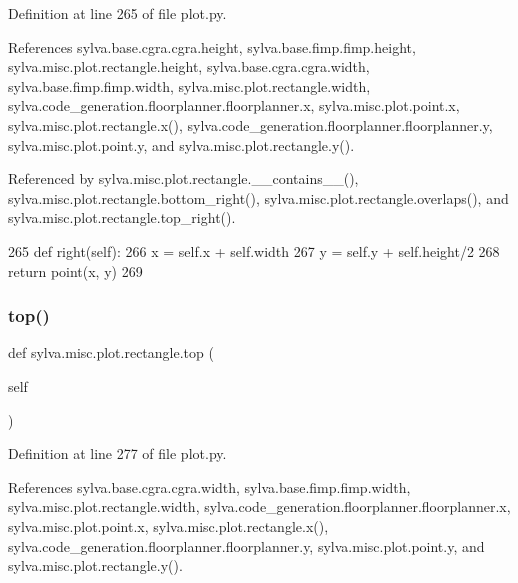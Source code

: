 Definition at line 265 of file plot.\+py.



References sylva.\+base.\+cgra.\+cgra.\+height, sylva.\+base.\+fimp.\+fimp.\+height, sylva.\+misc.\+plot.\+rectangle.\+height, sylva.\+base.\+cgra.\+cgra.\+width, sylva.\+base.\+fimp.\+fimp.\+width, sylva.\+misc.\+plot.\+rectangle.\+width, sylva.\+code\+\_\+generation.\+floorplanner.\+floorplanner.\+x, sylva.\+misc.\+plot.\+point.\+x, sylva.\+misc.\+plot.\+rectangle.\+x(), sylva.\+code\+\_\+generation.\+floorplanner.\+floorplanner.\+y, sylva.\+misc.\+plot.\+point.\+y, and sylva.\+misc.\+plot.\+rectangle.\+y().



Referenced by sylva.\+misc.\+plot.\+rectangle.\+\_\+\+\_\+contains\+\_\+\+\_\+(), sylva.\+misc.\+plot.\+rectangle.\+bottom\+\_\+right(), sylva.\+misc.\+plot.\+rectangle.\+overlaps(), and sylva.\+misc.\+plot.\+rectangle.\+top\+\_\+right().


\begin{DoxyCode}
265     \textcolor{keyword}{def }right(self):
266       x = self.x + self.width
267       y = self.y + self.height/2
268       \textcolor{keywordflow}{return} point(x, y)
269 
\end{DoxyCode}
\mbox{\label{classsylva_1_1misc_1_1plot_1_1rectangle_ac5b4d8952847953f5aa329fb839b63ad}} 
\subsubsection{\texorpdfstring{top()}{top()}}
{\footnotesize\ttfamily def sylva.\+misc.\+plot.\+rectangle.\+top (\begin{DoxyParamCaption}\item[{}]{self }\end{DoxyParamCaption})}



Definition at line 277 of file plot.\+py.



References sylva.\+base.\+cgra.\+cgra.\+width, sylva.\+base.\+fimp.\+fimp.\+width, sylva.\+misc.\+plot.\+rectangle.\+width, sylva.\+code\+\_\+generation.\+floorplanner.\+floorplanner.\+x, sylva.\+misc.\+plot.\+point.\+x, sylva.\+misc.\+plot.\+rectangle.\+x(), sylva.\+code\+\_\+generation.\+floorplanner.\+floorplanner.\+y, sylva.\+misc.\+plot.\+point.\+y, and sylva.\+misc.\+plot.\+rectangle.\+y().



